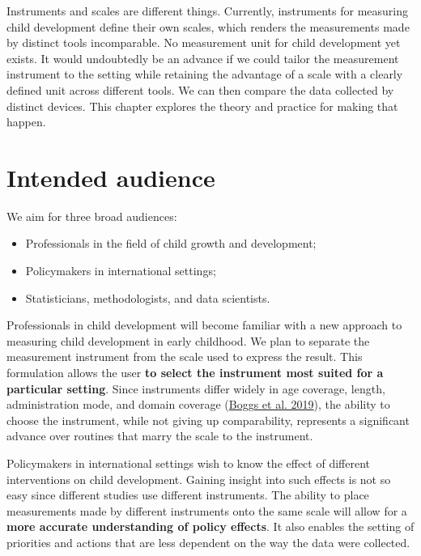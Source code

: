 \documentclass[
]{book}
\providecommand{\tightlist}{%
  \setlength{\itemsep}{0pt}\setlength{\parskip}{0pt}}
\begin{document}
Instruments and scales are different things. Currently, instruments for measuring child development define their own scales, which renders the measurements made by distinct tools incomparable. No measurement unit for child development yet exists. It would undoubtedly be an advance if we could tailor the measurement instrument to the setting while retaining the advantage of a scale with a clearly defined unit across different tools. We can then compare the data collected by distinct devices. This chapter explores the theory and practice for making that happen.

\hypertarget{sec:audience}{%
\section{Intended audience}\label{sec:audience}}

We aim for three broad audiences:

\begin{itemize}
\tightlist
\item
  Professionals in the field of child growth and development;
\item
  Policymakers in international settings;
\item
  Statisticians, methodologists, and data scientists.
\end{itemize}

Professionals in child development will become familiar with a new approach to measuring child development in early childhood. We plan to separate the measurement instrument from the scale used to express the result. This formulation allows the user \textbf{to select the instrument most suited for a particular setting}. Since instruments differ widely in age coverage, length, administration mode, and domain coverage (\protect\hyperlink{ref-boggs2019}{Boggs et al. 2019}), the ability to choose the instrument, while not giving up comparability, represents a significant advance over routines that marry the scale to the instrument.

Policymakers in international settings wish to know the effect of different interventions on child development. Gaining insight into such effects is not so easy since different studies use different instruments. The ability to place measurements made by different instruments onto the same scale will allow for a \textbf{more accurate understanding of policy effects}. It also enables the setting of priorities and actions that are less dependent on the way the data were collected.
\end{document}
